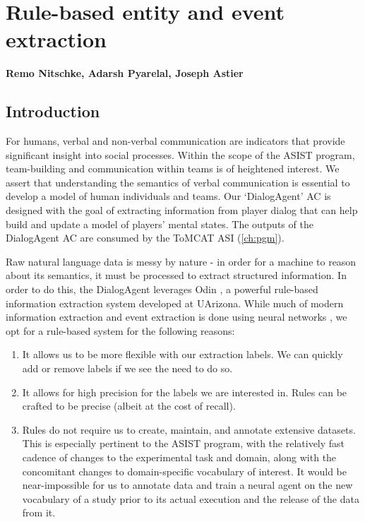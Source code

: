 \chapter{Rule-based entity and event extraction}
\label{ch:rule_based_ie}
\textbf{Remo Nitschke, Adarsh Pyarelal, Joseph Astier}

\section{Introduction}

For humans, verbal and non-verbal communication are indicators that provide
significant insight into social processes. Within the scope of the ASIST
program, team-building and communication within teams is of heightened
interest. We assert that understanding the semantics of verbal communication is
essential to develop a model of human individuals and teams. Our `DialogAgent'
AC is designed with the goal of extracting information from player dialog that
can help build and update a model of players' mental states. The outputs of the
DialogAgent AC are consumed by the ToMCAT ASI (\autoref{ch:pgm}).

Raw natural language data is messy by nature - in order for a machine to reason
about its semantics, it must be processed to extract structured information.
In order to do this, the DialogAgent leverages Odin
\cite{valenzuela-escarcega-etal-2016-odins}, a powerful rule-based information
extraction system developed at UArizona.  While much of modern information
extraction and event extraction is done using neural networks
\cite{Ahmad2021GATEGA, Du2020EventEB}, we opt for a rule-based system for the
following reasons:

\begin{enumerate}

 \item It allows us to be more flexible with our extraction labels. We can
     quickly add or remove labels if we see the need to do so.

 \item It allows for high precision for the labels we are interested in. Rules
     can be crafted to be precise (albeit at the cost of recall).

 \item Rules do not require us to create, maintain, and annotate extensive
     datasets. This is especially pertinent to the ASIST program, with the
     relatively fast cadence of changes to the experimental task and domain,
     along with the concomitant changes to domain-specific vocabulary of
     interest.  It would be near-impossible for us to annotate data and train a
     neural agent on the new vocabulary of a study prior to its actual
     execution and the release of the data from it. 

\end{enumerate}

